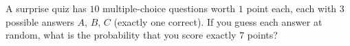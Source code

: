 A surprise quiz has $10$ multiple-choice questions worth $1$ point each, each with $3$ possible answers $A$, $B$, $C$ (exactly one correct). If you guess each answer at random, what is the probability that you score exactly $7$ points?
